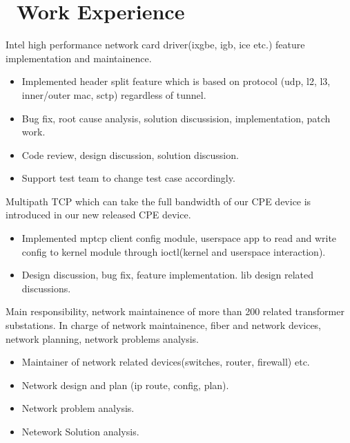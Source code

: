 \documentclass{resume}
\begin{document}



\section{\faUsers\ Work Experience}
Intel high performance network card driver(ixgbe, igb, ice etc.) feature implementation and maintainence.
\begin{itemize}
	\item Implemented header split feature which is based on protocol (udp, l2, l3, inner/outer mac, sctp) regardless of tunnel.
  \item Bug fix, root cause analysis, solution discussision, implementation, patch work. 
  \item Code review, design discussion, solution discussion.
  \item Support test team to change test case accordingly.
\end{itemize}

Multipath TCP which can take the full bandwidth of our CPE device  is introduced in our new released CPE device.
\begin{itemize}
	\item Implemented mptcp client config module, userspace app to read and write config to kernel module through ioctl(kernel and userspace interaction).
\item Design discussion, bug fix, feature implementation. lib design related discussions. 
\end{itemize}

Main responsibility, network maintainence of more than 200 related transformer substations.
In charge of network maintainence, fiber and network devices, network planning, network problems analysis.
\begin{itemize}
\item Maintainer of network related devices(switches, router, firewall) etc.
\item Network design and plan (ip route, config, plan).
\item Network problem analysis.
\item Netework Solution analysis.
\end{itemize}
\end{document}
